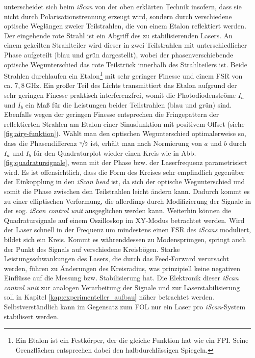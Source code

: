 unterscheidet sich beim \textit{iScan} von der oben erklärten Technik insofern,
dass sie nicht durch Polarisationstrennung erzeugt wird, sondern durch
verschiedene optische Weglängen zweier Teilstrahlen, die von einem Etalon
reflektiert werden. Der eingehende rote Strahl ist ein Abgriff des zu
stabilisierenden Lasers. An einem gekeilten Strahlteiler wird dieser in zwei
Teilstrahlen mit unterschiedlicher Phase aufgeteilt (blau und grün dargestellt),
wobei der phasenverschiebende optische Wegunterschied das rote Teilstrück
innerhalb des Strahlteilers ist. Beide Strahlen durchlaufen ein Etalon\footnote{Ein Etalon
ist ein Festkörper, der die gleiche Funktion hat wie ein FPI. Seine Grenzflächen
entsprechen dabei den halbdurchlässigen Spiegeln.} mit sehr geringer Finesse und
einem FSR von ca. $7,8\,$GHz. Ein großer Teil des Lichts transmittiert das
Etalon aufgrund der sehr geringen Finesse praktisch interferenzfrei, womit die
Photodiodenströme $I_a$ und $I_b$ ein Maß für die Leistungen beider Teilstrahlen
(blau und grün) sind. Ebenfalls wegen der geringen Finesse entsprechen die
Fringepattern der reflektierten Strahlen am Etalon einer Sinusfunktion mit
positivem Offset (siehe \ref{fig:airy-funktion}). Wählt man den optischen
Wegunterschied optimalerweise so, dass die Phasendifferenz $\nicefrac{\pi}{2}$
ist, erhält man nach Normierung von $a$ und $b$ durch $I_a$ und $I_b$ für den Quadraturplot
wieder einen Kreis wie in Abb. \ref{fig:quadratursignale}, wenn mit der Phase
bzw. der Laserfrequenz parametrisiert wird. Es ist offensichtlich, dass die Form
des Kreises sehr empfindlich gegenüber der Einkopplung in den \textit{iScan
head} ist, da sich der optische Wegunterschied und somit die Phase zwischen den
Teilstrahlen leicht ändern kann. Dadurch kommt es zu einer elliptischen
Verformung, die allerdings durch Modifizierung der Signale in der sog.
\textit{iScan control unit} \cite{iscan_hardware_guide} ausgeglichen werden
kann. Weiterhin können die Quadratursignale auf einem Oszilloskop im XY-Modus
betrachtet werden. Wird der Laser schnell in der Frequenz um mindestens einen
FSR des \textit{iScans} moduliert, bildet sich ein Kreis. Kommt es währenddessen zu
Modensprüngen, springt auch der Punkt des Signals auf verschiedene
Kreisbögen. Starke Leistungsschwankungen des Lasers, die durch das Feed-Forward
verursacht werden, führen zu Änderungen des Kreisradius, was prinzipiell keine negativen Einflüsse
auf die Messung bzw. Stabilisierung hat.
Die Elektronik dieser \textit{iScan control unit} zur analogen Verarbeitung der Signale und zur Laserstabilisierung soll in Kapitel \ref{kap:experimenteller_aufbau} näher betrachtet werden.
Selbstverständlich kann im Gegensatz zum FOL nur ein Laser pro
\textit{iScan}-System stabilisert werden.

